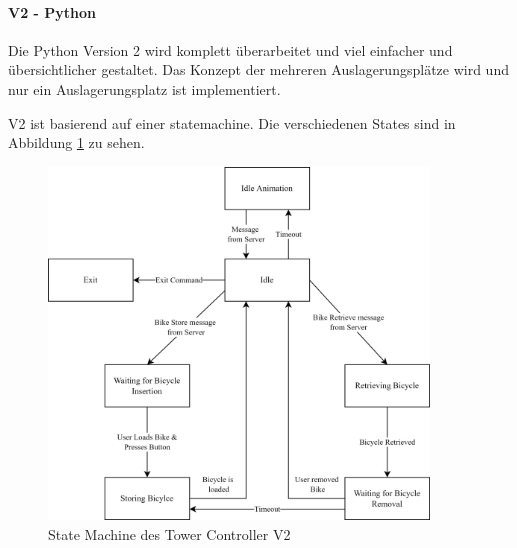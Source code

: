 \paragraph{V2 - Python}
Die Python Version 2 wird komplett überarbeitet und viel einfacher und übersichtlicher gestaltet. Das Konzept der mehreren Auslagerungsplätze wird und nur ein Auslagerungsplatz ist implementiert.

\noindent V2 ist basierend auf einer \Gls{statemachine}. Die verschiedenen States sind in Abbildung \ref{fig:tower_controller_v1_state_machine} zu sehen.

\begin{figure}[H]
  \centering
  \includegraphics[width=0.9\textwidth]{images/tower_controller_v2_state_machine.png}
  \caption{State Machine des Tower Controller V2}
  \label{fig:tower_controller_v1_state_machine}
\end{figure}

\clearpage

